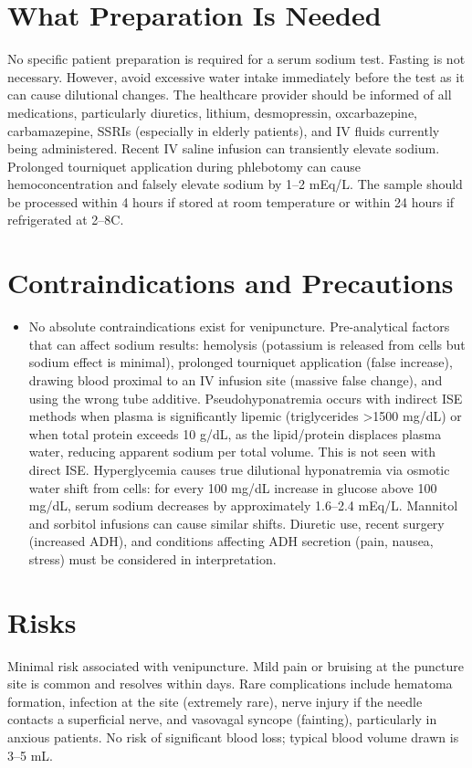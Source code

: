 \section*{What Preparation Is Needed}
No specific patient preparation is required for a serum sodium test. Fasting is not necessary. However, avoid excessive water intake immediately before the test as it can cause dilutional changes. The healthcare provider should be informed of all medications, particularly diuretics, lithium, desmopressin, oxcarbazepine, carbamazepine, SSRIs (especially in elderly patients), and IV fluids currently being administered. Recent IV saline infusion can transiently elevate sodium. Prolonged tourniquet application during phlebotomy can cause hemoconcentration and falsely elevate sodium by 1--2 mEq/L. The sample should be processed within 4 hours if stored at room temperature or within 24 hours if refrigerated at 2--8\textdegree C.

\section*{Contraindications and Precautions}
\begin{itemize}
  \item No absolute contraindications exist for venipuncture. Pre-analytical factors that can affect sodium results: hemolysis (potassium is released from cells but sodium effect is minimal), prolonged tourniquet application (false increase), drawing blood proximal to an IV infusion site (massive false change), and using the wrong tube additive. Pseudohyponatremia occurs with indirect ISE methods when plasma is significantly lipemic (triglycerides >1500 mg/dL) or when total protein exceeds 10 g/dL, as the lipid/protein displaces plasma water, reducing apparent sodium per total volume. This is not seen with direct ISE. Hyperglycemia causes true dilutional hyponatremia via osmotic water shift from cells: for every 100 mg/dL increase in glucose above 100 mg/dL, serum sodium decreases by approximately 1.6--2.4 mEq/L. Mannitol and sorbitol infusions can cause similar shifts. Diuretic use, recent surgery (increased ADH), and conditions affecting ADH secretion (pain, nausea, stress) must be considered in interpretation.
\end{itemize}
\section*{Risks}
Minimal risk associated with venipuncture. Mild pain or bruising at the puncture site is common and resolves within days. Rare complications include hematoma formation, infection at the site (extremely rare), nerve injury if the needle contacts a superficial nerve, and vasovagal syncope (fainting), particularly in anxious patients. No risk of significant blood loss; typical blood volume drawn is 3--5 mL.


